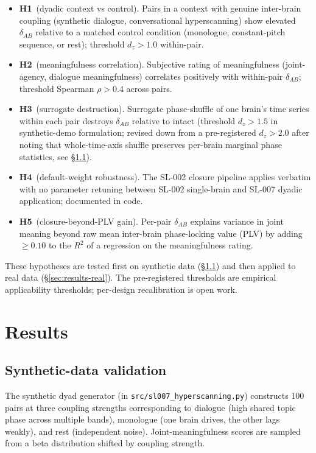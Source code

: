 \documentclass[11pt,a4paper]{article}
\begin{document}
\begin{itemize}\itemsep0pt
\item \textbf{H1}~(dyadic context vs control). Pairs in a context with genuine inter-brain coupling (synthetic dialogue, conversational hyperscanning) show elevated $\delta_{AB}$ relative to a matched control condition (monologue, constant-pitch sequence, or rest); threshold $d_z > 1.0$ within-pair.
\item \textbf{H2}~(meaningfulness correlation). Subjective rating of meaningfulness (joint-agency, dialogue meaningfulness) correlates positively with within-pair $\delta_{AB}$; threshold Spearman $\rho > 0.4$ across pairs.
\item \textbf{H3}~(surrogate destruction). Surrogate phase-shuffle of one brain's time series within each pair destroys $\delta_{AB}$ relative to intact (threshold $d_z > 1.5$ in synthetic-demo formulation; revised down from a pre-registered $d_z > 2.0$ after noting that whole-time-axis shuffle preserves per-brain marginal phase statistics, see \S\ref{sec:results-synthetic}).
\item \textbf{H4}~(default-weight robustness). The SL-002 closure pipeline applies verbatim with no parameter retuning between SL-002 single-brain and SL-007 dyadic application; documented in code.
\item \textbf{H5}~(closure-beyond-PLV gain). Per-pair $\delta_{AB}$ explains variance in joint meaning beyond raw mean inter-brain phase-locking value (PLV) by adding $\geq 0.10$ to the $R^2$ of a regression on the meaningfulness rating.
\end{itemize}

These hypotheses are tested first on synthetic data (\S\ref{sec:results-synthetic}) and then applied to real data (\S\ref{sec:results-real}). The pre-registered thresholds are empirical applicability thresholds; per-design recalibration is open work.

\section{Results}\label{sec:results}

\subsection{Synthetic-data validation}\label{sec:results-synthetic}

The synthetic dyad generator (in \texttt{src/sl007\_hyperscanning.py}) constructs 100 pairs at three coupling strengths corresponding to dialogue (high shared topic phase across multiple bands), monologue (one brain drives, the other lags weakly), and rest (independent noise). Joint-meaningfulness scores are sampled from a beta distribution shifted by coupling strength.
\end{document}
